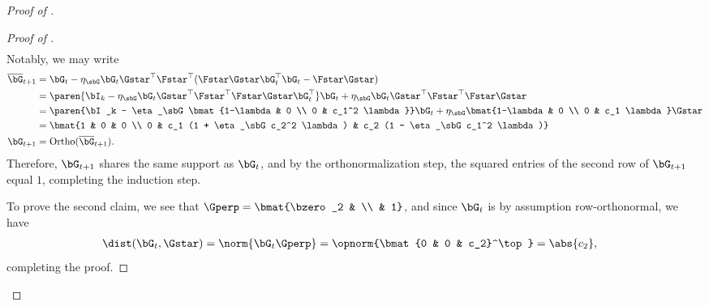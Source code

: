 \begin{proof}[Proof of ]
\begin{proof}[Proof of ]
\begin{align*}
    \end{align*}
    Notably, we may write
    \begin{align}
    \begin{split}\label{eq:LB_grad_update}
        \overline\bG_{t+1} &= \bG_t - \eta_\sbG  \bG_t \Gstar^\top \Fstar^\top (\Fstar\Gstar \bG_t^\top \bG_t - \Fstar \Gstar) \\
        &= \paren{\bI_{k} - \eta_\sbG  \bG_t \Gstar^\top \Fstar^\top \Fstar\Gstar \bG_t^\top } \bG_t + \eta_\sbG  \bG_t \Gstar^\top \Fstar^\top \Fstar \Gstar \\
        &= \paren{\bI_k - \eta_\sbG \bmat{1-\lambda & 0 \\ 0 & c_1^2 \lambda  }} \bG_t + \eta_\sbG \bmat{1-\lambda & 0 \\ 0 & c_1 \lambda  } \Gstar \\
        &= \bmat{1 & 0 & 0 \\
        0 & c_1 (1 + \eta_\sbG c_2^2 \lambda) & c_2 (1 - \eta_\sbG c_1^2 \lambda)} \\
        \bG_{t+1} &= \mathrm{Ortho}(\overline\bG_{t+1}).
    \end{split}
    \end{align}
    Therefore, $\bG_{t+1}$ shares the same support as $\bG_t$, and by the orthonormalization step, the squared entries of the second row of $\bG_{t+1}$ equal $1$, completing the induction step.

    To prove the second claim, we see that $\Gperp = \bmat{\bzero_2 & \\ & 1}$, and since $\bG_t$ is by assumption row-orthonormal, we have
    \begin{align*}
        \dist(\bG_t, \Gstar) &= \norm{\bG_t \Gperp} = \opnorm{\bmat{0 & 0 & c_2}^\top} = \abs{c_2},
    \end{align*}
    completing the proof.
    \end{proof}


\end{proof}
